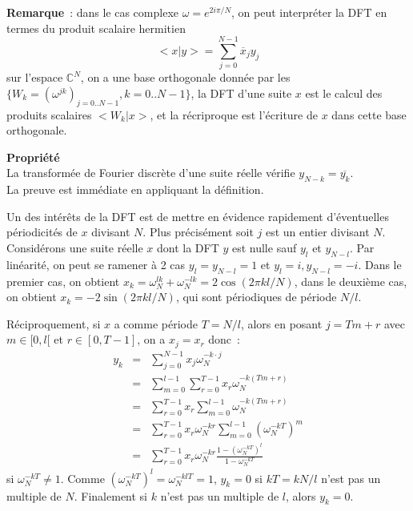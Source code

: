 \documentclass[a4paper,11pt]{book}
\begin{document}
\begin{giacjshere}
{\bf Remarque}~: dans le cas complexe $\omega=e^{2i\pi/N}$, 
on peut interpr\'eter la DFT
en termes du produit scalaire hermitien
$$ <x|y>=\sum_{j=0}^{N-1} \overline{x}_j y_j$$
sur l'espace $\mathbb{C}^N$, on a une base orthogonale donn\'ee par 
les $\{ W_k=(\omega^{jk})_{j=0..N-1}, k=0..N-1\}$, la DFT d'une suite $x$ est le calcul
des produits scalaires $<W_k|x>$, et la r\'ecriproque est l'\'ecriture
de $x$ dans cette base orthogonale.


{\bf Propriété}\\
La transformée de Fourier discrète d'une suite réelle vérifie
$y_{N-k}=\overline{y_k}$.\\
La preuve est immédiate en appliquant la définition.

Un des intérêts de la DFT est de mettre en évidence rapidement
d'éventuelles périodicités de $x$ divisant $N$. Plus précisément
soit $j$ est un entier divisant $N$. Considérons une suite réelle $x$ dont
la DFT $y$ est nulle sauf $y_l$ et $y_{N-l}$. Par linéarité, on
peut se ramener à 2 cas $y_l=y_{N-l}=1$ et $y_l=i, y_{N-l}=-i$. Dans
le premier cas, on obtient $x_k=\omega_N^{lk}+\omega_N^{-lk}=2\cos(2\pi kl/N)$,
dans le deuxième cas, on obtient $x_k=-2\sin(2\pi kl/N)$, qui sont périodiques
de période $N/l$.

Réciproquement, si $x$ a comme période $T=N/l$, alors en posant
$j=T m + r$ avec $m\in[0,l[$ et $r\in[0,T-1]$, on a
$x_j=x_r$ donc~:
\begin{eqnarray*}
 y_k &=&\sum_{j=0}^{N-1} x_j \omega_N^{-k\cdot j} \\
&=&\sum_{m=0}^{l-1} \sum_{r=0}^{T-1} x_r \omega_N^{-k (T m+r)} \\
&=&\sum_{r=0}^{T-1} x_r \sum_{m=0}^{l-1} \omega_N^{-k (T m+r)} \\
&=& \sum_{r=0}^{T-1} x_r \omega_N^{-kr} \sum_{m=0}^{l-1}
(\omega_N^{-kT})^m \\
&=& \sum_{r=0}^{T-1} x_r \omega_N^{-kr} 
\frac{1-(\omega_N^{-kT})^l}{1-\omega_N^{-kT}}
\end{eqnarray*}
si $\omega_N^{-kT} \neq 1$. Comme $(\omega_N^{-kT})^l=\omega_N^{-klT}=1$,
$y_k=0$ si $kT=kN/l$ n'est pas un multiple de $N$. 
Finalement si $k$ n'est pas un multiple de $l$, alors $y_k=0$.


\end{giacjshere}
\end{document}

